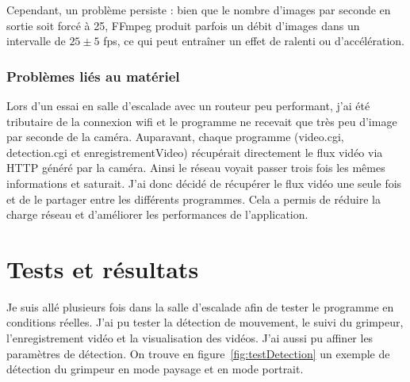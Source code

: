 \documentclass[a4paper, 11pt, french]{article}
\begin{document}
Cependant, un problème persiste : bien que le nombre d'images par seconde en sortie soit forcé à 25, FFmpeg produit parfois un débit d'images dans un intervalle de \(25\pm 5\) fps, ce qui peut entraîner un effet de ralenti ou d'accélération.

\subsubsection{Problèmes liés au matériel} Lors d'un essai en salle d'escalade avec un routeur peu performant, j'ai été tributaire de la connexion wifi et le programme ne recevait que très peu d'image par seconde de la caméra. Auparavant, chaque programme (video.cgi, detection.cgi et enregistrementVideo) récupérait directement le flux vidéo via HTTP généré par la caméra. Ainsi le réseau voyait passer trois fois les mêmes informations et saturait. J'ai donc décidé de récupérer le flux vidéo une seule fois et de le partager entre les différents programmes. Cela a permis de réduire la charge réseau et d'améliorer les performances de l'application.





\section{Tests et résultats}
Je suis allé plusieurs fois dans la salle d'escalade afin de tester le programme en conditions réelles. J'ai pu tester la détection de mouvement, le suivi du grimpeur, l'enregistrement vidéo et la visualisation des vidéos. J'ai aussi pu affiner les paramètres de détection. On trouve en figure~\ref{fig:testDetection} un exemple de détection du grimpeur en mode paysage et en mode portrait.
\end{document}
